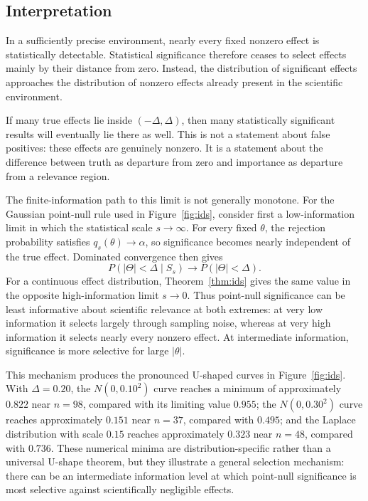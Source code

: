 \documentclass[11pt]{article}
\theoremstyle{remark}
\begin{document}
\subsection{Interpretation}

In a sufficiently precise environment, nearly every fixed nonzero effect is statistically detectable. Statistical significance therefore ceases to select effects mainly by their distance from zero. Instead, the distribution of significant effects approaches the distribution of nonzero effects already present in the scientific environment.

If many true effects lie inside $(-\Delta,\Delta)$, then many statistically significant results will eventually lie there as well. This is not a statement about false positives: these effects are genuinely nonzero. It is a statement about the difference between truth as departure from zero and importance as departure from a relevance region.

The finite-information path to this limit is not generally monotone. For the Gaussian point-null rule used in Figure~\ref{fig:ids}, consider first a low-information limit in which the statistical scale $s\to\infty$. For every fixed $\theta$, the rejection probability satisfies $q_s(\theta)\to\alpha$, so significance becomes nearly independent of the true effect. Dominated convergence then gives
\[
P(|\Theta|<\Delta\mid S_s)\longrightarrow P(|\Theta|<\Delta).
\]
For a continuous effect distribution, Theorem~\ref{thm:ids} gives the same value in the opposite high-information limit $s\to0$. Thus point-null significance can be least informative about scientific relevance at both extremes: at very low information it selects largely through sampling noise, whereas at very high information it selects nearly every nonzero effect. At intermediate information, significance is more selective for large $|\theta|$.

This mechanism produces the pronounced U-shaped curves in Figure~\ref{fig:ids}. With $\Delta=0.20$, the $N(0,0.10^2)$ curve reaches a minimum of approximately $0.822$ near $n=98$, compared with its limiting value $0.955$; the $N(0,0.30^2)$ curve reaches approximately $0.151$ near $n=37$, compared with $0.495$; and the Laplace distribution with scale $0.15$ reaches approximately $0.323$ near $n=48$, compared with $0.736$. These numerical minima are distribution-specific rather than a universal U-shape theorem, but they illustrate a general selection mechanism: there can be an intermediate information level at which point-null significance is most selective against scientifically negligible effects.
\end{document}
